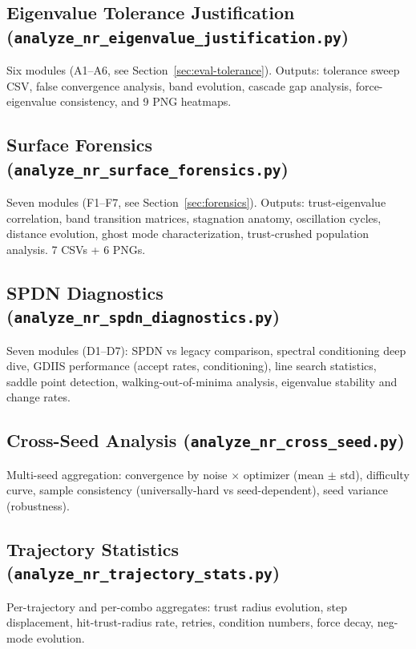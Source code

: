 \documentclass[11pt,a4paper]{article}
\begin{document}
\subsection{Eigenvalue Tolerance Justification (\texttt{analyze\_nr\_eigenvalue\_justification.py})}

Six modules (A1--A6, see Section~\ref{sec:eval-tolerance}). Outputs: tolerance sweep CSV, false convergence analysis, band evolution, cascade gap analysis, force-eigenvalue consistency, and 9 PNG heatmaps.

\subsection{Surface Forensics (\texttt{analyze\_nr\_surface\_forensics.py})}

Seven modules (F1--F7, see Section~\ref{sec:forensics}). Outputs: trust-eigenvalue correlation, band transition matrices, stagnation anatomy, oscillation cycles, distance evolution, ghost mode characterization, trust-crushed population analysis. 7 CSVs + 6 PNGs.

\subsection{SPDN Diagnostics (\texttt{analyze\_nr\_spdn\_diagnostics.py})}

Seven modules (D1--D7): SPDN vs legacy comparison, spectral conditioning deep dive, GDIIS performance (accept rates, conditioning), line search statistics, saddle point detection, walking-out-of-minima analysis, eigenvalue stability and change rates.

\subsection{Cross-Seed Analysis (\texttt{analyze\_nr\_cross\_seed.py})}

Multi-seed aggregation: convergence by noise $\times$ optimizer (mean $\pm$ std), difficulty curve, sample consistency (universally-hard vs seed-dependent), seed variance (robustness).

\subsection{Trajectory Statistics (\texttt{analyze\_nr\_trajectory\_stats.py})}

Per-trajectory and per-combo aggregates: trust radius evolution, step displacement, hit-trust-radius rate, retries, condition numbers, force decay, neg-mode evolution.
\end{document}
